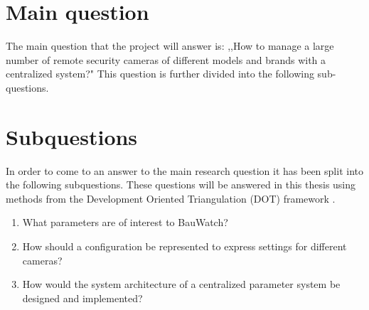 
\section{Main question}
The main question that the project will answer is: ,,How to manage a large number of remote security cameras of different models and brands with a centralized system?"
This question is further divided into the following sub-questions.

\section{Subquestions}
In order to come to an answer to the main research question it has been split into the following subquestions.
These questions will be answered in this thesis using methods from the Development Oriented Triangulation (DOT) framework \cite{noauthor_dot_nodate}.
\begin{enumerate}
	\item What parameters are of interest to BauWatch?
	\item How should a configuration be represented to express settings for different cameras?
	\item How would the system architecture of a centralized parameter system be designed and implemented?
\end{enumerate}

